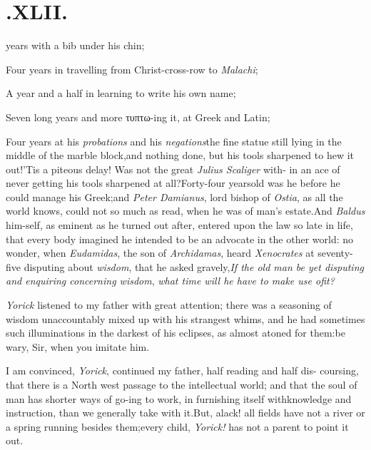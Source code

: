 \documentclass{article}
\begin{document}
\section{.\enspace  XLII.}

years with a bib
under his chin;

Four years in travelling from Christ-cross-row to
\textit{Malachi};

A year and a half in learning to write his own name;

Seven long years and more τυπτω-ing it, at Greek and Latin;

Four years at his \textit{probations} and his
\textit{negations}\tsk the fine statue still lying in
the middle of
the marble block,\tsk and nothing done, but his tools sharpened
to hew it out!\tsk ’Tis a piteous delay!\tsk\break
Was not the great \textit{Julius Scaliger} with-\break
in an ace of never getting his tools\break
sharpened at all?\tsh Forty-four years\break old was he
before he could manage his Greek;\tsh and \textit{Peter Damianus},
lord bishop of \textit{Ostia}, as all the world knows, could not so
much as read, when he was of man’s estate.\tsh And
\textit{Baldus} him-\break self, as eminent
as he turned out after,\break
entered
upon the law so late in life, that every body imagined he intended to be an advocate in
the other world: no\break
wonder, when \textit{Eudamidas}, the son of\break
\textit{Archidamas}, heard \textit{Xenocrates} at seventy-five
disputing about \textit{wisdom}, that he\break
asked gravely,\tsk \textit{If the old man be yet disputing and enquiring concerning
wisdom},
\textit{\tsk what time will he have to make
use of\break it?}

\textit{Yorick} listened to my father with great attention; there
was a seasoning of wisdom unaccountably mixed up with his strangest
whims, and he had sometimes such illuminations in the darkest of
his eclipses, as almost atoned for them:\tsk\break be wary, Sir, when
you imitate him.

I am convinced, \textit{Yorick}, continued\break
my father, half reading and half dis-\break
coursing, that there is a North west passage to the
intellectual world; and that the soul of man has shorter ways of
go-\break ing to work, in furnishing itself with\break knowledge and instruction,
than we generally take with it.\tsh But, alack! all fields
have not a river or a spring running besides them;\tsk every
child, \textit{Yorick!} has not a parent to point it out.
\end{document}
